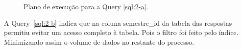 \documentclass[a4paper,12pt]{article}
\begin{document}
\begin{figure}[hpt]
   \begin{center}
      \\
      \\
   \end{center}
   \caption{Plano de execução para a Query \ref{sql:2-a}.}
   \label{fig:plano_2-a}
\end{figure}

A Query~\ref{sql:2-b}  indica que na coluna semestre\_id da tabela das respostas
permitiu evitar um acesso completo à tabela. Pois o filtro foi feito
pelo índice. Minimizando assim o volume de dados no restante do processo.

\begin{program}
   
   \caption{Pergunta sobre agregação 2.b.}
   \label{sql:2-b}
\end{program}
\end{document}
